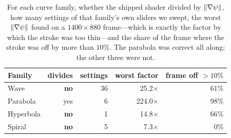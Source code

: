 \begin{table}[t]
\caption{ For each curve
family, whether the shipped shader divided by $\lVert\nabla\psi\rVert$, how many
settings of that family's own sliders we swept, the worst
$\lVert\nabla\psi\rVert$ found on a $1400\times880$ frame---which is exactly
the factor by which the stroke was too thin---and the share of the frame where
the stroke was off by more than $10\%$. The parabola was correct all along; the
other three were not.}
\label{tab:gradient}
\small
\begin{tabular}{@{}lrrrr@{}}
\toprule
Family & divides & settings & worst factor & frame off $>10\%$ \\
\midrule
Wave & \textbf{no} & 36 & 25.2$\times$ & 61\% \\
Parabola & yes & 6 & 224.0$\times$ & 98\% \\
Hyperbola & \textbf{no} & 1 & 14.8$\times$ & 66\% \\
Spiral & \textbf{no} & 5 & 7.3$\times$ & 0\% \\
\bottomrule
\end{tabular}
\end{table}
